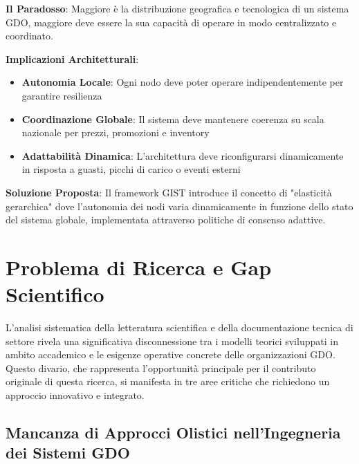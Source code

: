 \begin{tcolorbox}[
    colback=blue!5!white,
    colframe=blue!75!black,
    title={\textbf{Innovation Box 1.1:} Il Paradosso della Complessità Sistemica nella GDO},
    fonttitle=\bfseries,
    boxrule=1.5pt,
    arc=2mm,
    breakable
]
\textbf{Il Paradosso}: Maggiore è la distribuzione geografica e tecnologica di un sistema GDO, maggiore deve essere la sua capacità di operare in modo centralizzato e coordinato.

\vspace{0.3cm}
\textbf{Implicazioni Architetturali}:
\begin{itemize}
    \item \textbf{Autonomia Locale}: Ogni nodo deve poter operare indipendentemente per garantire resilienza
    \item \textbf{Coordinazione Globale}: Il sistema deve mantenere coerenza su scala nazionale per prezzi, promozioni e inventory
    \item \textbf{Adattabilità Dinamica}: L'architettura deve riconfigurarsi dinamicamente in risposta a guasti, picchi di carico o eventi esterni
\end{itemize}

\vspace{0.3cm}
\textbf{Soluzione Proposta}: Il framework GIST introduce il concetto di "elasticità gerarchica" dove l'autonomia dei nodi varia dinamicamente in funzione dello stato del sistema globale, implementata attraverso politiche di consenso adattive.
\end{tcolorbox}

\section{Problema di Ricerca e Gap Scientifico}

L'analisi sistematica della letteratura scientifica e della documentazione tecnica di settore rivela una significativa disconnessione tra i modelli teorici sviluppati in ambito accademico e le esigenze operative concrete delle organizzazioni GDO. Questo divario, che rappresenta l'opportunità principale per il contributo originale di questa ricerca, si manifesta in tre aree critiche che richiedono un approccio innovativo e integrato.

\subsection{Mancanza di Approcci Olistici nell'Ingegneria dei Sistemi GDO}

